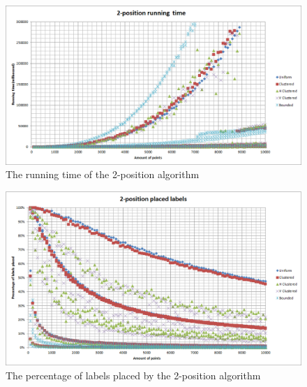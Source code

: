 \documentclass[crop=false,a4paper,oneside,11pt]{standalone}
\begin{document}
\begin{figure}[H]
 \centering
  \centerline{\includegraphics[scale = 0.5]{2PosRunningTime.png}}
  \caption{The running time of the 2-position algorithm}
 \end{figure}

\begin{figure}[H]
 \centering
  \centerline{\includegraphics[scale = 0.5]{2PosLabelsPlaced.png}}
  \caption{The percentage of labels placed by the 2-position algorithm}
 \end{figure}
\end{document}
